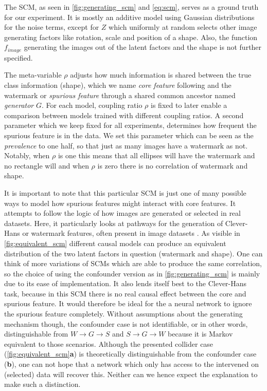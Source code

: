 The SCM, as seen in \cref{fig:generating_scm} and \cref{eq:scm}, serves as a ground truth for our experiment. It is mostly an additive model using Gaussian distributions for the noise terms, except for $Z$ which uniformly at random selects other image generating factors like rotation, scale and position of a shape. Also, the function $f_{image}$ generating the images out of the latent factors and the shape is not further specified.

The meta-variable $\rho$ adjusts how much information is shared between the true class information (shape), which we name \textit{core feature} following \cite{Singla2022} and the watermark or \textit{spurious feature} through a shared common ancestor named \textit{generator} $G$. For each model, coupling ratio $\rho$ is fixed to later enable a comparison between models trained with different coupling ratios. 
A second parameter which we keep fixed for all experiments, determines how frequent the spurious feature is in the data. We set this parameter which can be seen as the \textit{prevalence} to one half, so that just as many images have a watermark as not. Notably, when $\rho$ is one this means that all ellipses will have the watermark and no rectangle will and when $\rho$ is zero there is no correlation of watermark and shape. 

It is important to note that this particular SCM is just one of many possible ways to model how spurious features might interact with core features. It attempts to follow the logic of how images are generated or selected in real datasets. Here, it particularly looks at pathways for the generation of Clever-Hans or watermark features, often present in image datasets \citep{Lapuschkin2019}. As visible in \cref{fig:equivalent_scm} different causal models can produce an equivalent distribution of the two latent factors in question (watermark and shape). One can think of more variations of SCMs which are able to produce the same correlation, so the choice of using the confounder version as in \cref{fig:generating_scm} is mainly due to its ease of implementation. It also lends itself best to the Clever-Hans task, because in this SCM there is no real causal effect between the core and spurious feature. It would therefore be ideal for the a neural network to ignore the spurious feature completely. Without assumptions about the generating mechanism though, the confounder case is not identifiable, or in other words, distinguishable from $W \rightarrow G \rightarrow S$ and $S \rightarrow G \rightarrow W$ because it is Markov equivalent to those scenarios. 
Although the presented collider case (\cref{fig:equivalent_scm}\textbf{a}) is theoretically distinguishable from the confounder case (\textbf{b}), one can not hope that a network which only has access to the intervened on (selected) data will recover this. Neither can we hence expect the explanation to make such a distinction.

